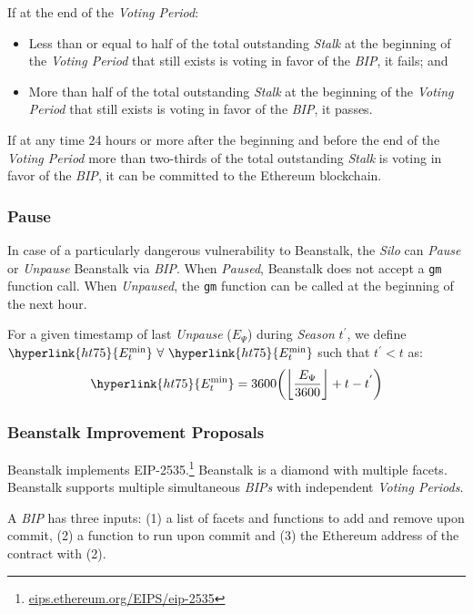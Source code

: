 \documentclass[tikz]{article}
\newcommand{\code}[1]{\texttt{#1}}
\newcommand{\term}[1]{\textsl{#1}}
\newcommand{\fref}[1]{\footnote{\href{http://#1}{#1}}}
\begin{document}
If at the end of the \term{Voting Period}:
\begin{itemize}[midsep]
    \item Less than or equal to half of the total outstanding \term{Stalk} at the beginning of the \term{Voting Period} that still exists is voting in favor of the \term{BIP}, it fails; and
    \item More than half of the total outstanding \term{Stalk} at the beginning of the \term{Voting Period} that still exists is voting in favor of the \term{BIP}, it passes.
\end{itemize}

If at any time 24 hours or more after the beginning and before the end of the \term{Voting Period} more than two-thirds of the total outstanding \term{Stalk} is voting in favor of the \term{BIP}, it can be committed to the Ethereum blockchain.

\subsubsection{Pause}
In case of a particularly dangerous vulnerability to Beanstalk, the \term{Silo} can \term{Pause} or \term{Unpause} Beanstalk via \term{BIP}. When \term{Paused}, Beanstalk does not accept a \code{gm} function call. When \term{Unpaused}, the \code{gm} function can be called at the beginning of the next hour.

For a given timestamp of last \term{Unpause} (\hyperlink{ht78}{$E_{\Psi}$}) during \term{Season} $t^{'}$, we define $\hyperlink{ht75}{E_{t}^{\text{min}}}\ \forall\ \hyperlink{ht75}{E_{t}^{\text{min}}}$ such that $t^{'} < t$ as:
$$\hyperlink{ht75}{E_{t}^{\text{min}}} = 3600{\left({\left\lfloor\frac{E_{\Psi}}{3600}\right\rfloor} + t - t^{'}\right)}$$

\subsubsection{Beanstalk Improvement Proposals}
Beanstalk implements EIP-2535.\fref{eips.ethereum.org/EIPS/eip-2535} Beanstalk is a diamond with multiple facets. Beanstalk supports multiple simultaneous \term{BIPs} with independent \term{Voting Periods}.

A \term{BIP} has three inputs: (1) a list of facets and functions to add and remove upon commit, (2) a function to run upon commit and (3) the Ethereum address of the contract with (2).
\end{document}
